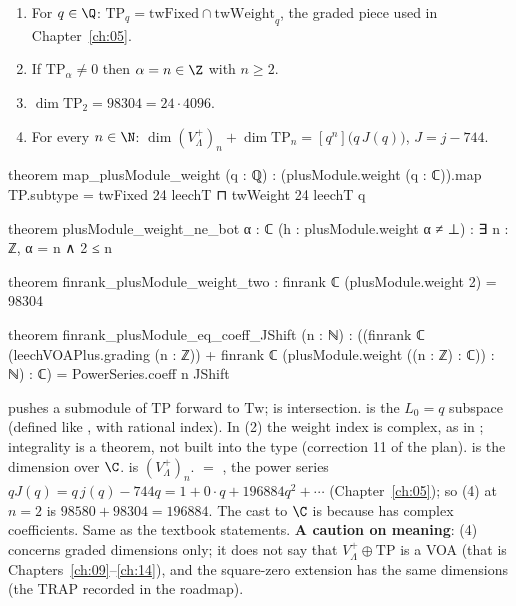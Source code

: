 \begin{theorem}\label{ch08:thm:dims}
\begin{enumerate}
\item For $q\in\Q$: $\mathrm{TP}_q=\mathrm{twFixed}\cap\mathrm{twWeight}_q$, the graded piece used in
  Chapter~\ref{ch:05}.
\item If $\mathrm{TP}_\alpha\ne0$ then $\alpha=n\in\Z$ with $n\ge2$.
\item $\dim\mathrm{TP}_2=98304=24\cdot4096$.
\item For every $n\in\N$: $\dim(V_\Lambda^+)_n+\dim\mathrm{TP}_n=[q^n]\bigl(q\,J(q)\bigr)$, $J=j-744$.
\end{enumerate}
\end{theorem}
\begin{leancode}
theorem map_plusModule_weight (q : ℚ) :
    (plusModule.weight (q : ℂ)).map TP.subtype = twFixed 24 leechT ⊓ twWeight 24 leechT q

theorem plusModule_weight_ne_bot {α : ℂ} (h : plusModule.weight α ≠ ⊥) :
    ∃ n : ℤ, α = n ∧ 2 ≤ n

theorem finrank_plusModule_weight_two : finrank ℂ (plusModule.weight 2) = 98304

theorem finrank_plusModule_eq_coeff_JShift (n : ℕ) :
    ((finrank ℂ (leechVOAPlus.grading (n : ℤ))
      + finrank ℂ (plusModule.weight ((n : ℤ) : ℂ)) : ℕ) : ℂ)
      = PowerSeries.coeff n JShift
\end{leancode}
\begin{dictionary}
 pushes a submodule of $\mathrm{TP}$ forward to $\mathrm{Tw}$;  is
intersection.   is the $L_0=q$ subspace (defined like
, with rational index).  In (2) the weight index is complex, as in
; integrality is a theorem, not built into the type (correction 11 of the plan).
 is the dimension over $\C$.   is $(V_\Lambda^+)_n$.
 $=$ , the power series $qJ(q)=q\,j(q)-744q
=1+0\cdot q+196884q^2+\cdots$ (Chapter~\ref{ch:05}); so (4) at $n=2$ is $98580+98304=196884$.
The cast to $\C$ is because  has complex coefficients.  Same as the textbook
statements.  \textbf{A caution on meaning}: (4) concerns graded dimensions only; it does not say
that $V_\Lambda^+\oplus\mathrm{TP}$ is a VOA (that is Chapters~\ref{ch:09}--\ref{ch:14}), and the
square-zero extension has the same dimensions (the TRAP recorded in the roadmap).
\end{dictionary}

